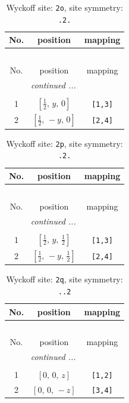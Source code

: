 \documentclass[fleqn,8pt]{jsarticle}
\begin{document}
\renewcommand{\arraystretch}{1.2}
\begin{longtable}{ccc}
\caption{Wyckoff site: {\tt 2o}, site symmetry: {\tt .2.}}
 \\
 \hline \hline
No. & position & mapping \\ \hline \endfirsthead

\multicolumn{2}{l}{\tablename\ \thetable{}} \\
 \hline \hline
No. & position & mapping \\ \hline \endhead

 \hline \hline
\multicolumn{2}{r}{\footnotesize\it continued ...} \\ \endfoot

 \hline \hline
\multicolumn{2}{r}{} \\ \endlastfoot

1 & $\left[ \frac{1}{2},\, y,\, 0 \right]$ & {\tt [1,3]} \\ \hline
2 & $\left[ \frac{1}{2},\, - y,\, 0 \right]$ & {\tt [2,4]} \\
\end{longtable}
\renewcommand{\arraystretch}{1.2}
\begin{longtable}{ccc}
\caption{Wyckoff site: {\tt 2p}, site symmetry: {\tt .2.}}
 \\
 \hline \hline
No. & position & mapping \\ \hline \endfirsthead

\multicolumn{2}{l}{\tablename\ \thetable{}} \\
 \hline \hline
No. & position & mapping \\ \hline \endhead

 \hline \hline
\multicolumn{2}{r}{\footnotesize\it continued ...} \\ \endfoot

 \hline \hline
\multicolumn{2}{r}{} \\ \endlastfoot

1 & $\left[ \frac{1}{2},\, y,\, \frac{1}{2} \right]$ & {\tt [1,3]} \\ \hline
2 & $\left[ \frac{1}{2},\, - y,\, \frac{1}{2} \right]$ & {\tt [2,4]} \\
\end{longtable}
\renewcommand{\arraystretch}{1.2}
\begin{longtable}{ccc}
\caption{Wyckoff site: {\tt 2q}, site symmetry: {\tt ..2}}
 \\
 \hline \hline
No. & position & mapping \\ \hline \endfirsthead

\multicolumn{2}{l}{\tablename\ \thetable{}} \\
 \hline \hline
No. & position & mapping \\ \hline \endhead

 \hline \hline
\multicolumn{2}{r}{\footnotesize\it continued ...} \\ \endfoot

 \hline \hline
\multicolumn{2}{r}{} \\ \endlastfoot

1 & $\left[ 0,\, 0,\, z \right]$ & {\tt [1,2]} \\ \hline
2 & $\left[ 0,\, 0,\, - z \right]$ & {\tt [3,4]} \\
\end{longtable}
\end{document}
